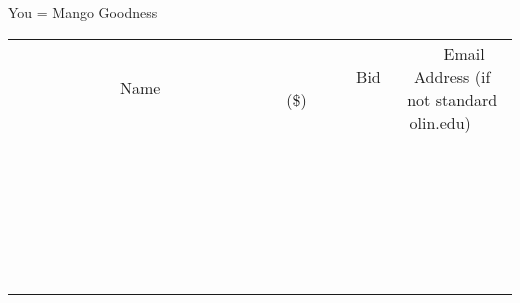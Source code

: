 \documentclass[11pt]{article}
\begin{document}
You = Mango Goodness
\\[6ex]
\begin{tabular}{c c c}
~~~~~~~~~~~~~Name~~~~~~~~~~~~~ & ~~~~~~~~~Bid (\$)~~~~~~~~~  & ~~~Email Address (if not standard olin.edu)~~~\\
 & & \\
\hline
 & & \\
\hline
 & & \\
\hline
 & & \\
\hline
 & & \\
\hline
 & & \\
\hline
 & & \\
\hline
 & & \\
\hline
 & & \\
\hline
 & & \\
\hline
 & & \\
\hline
 & & \\
\hline
 & & \\
\hline
 & & \\
\hline
 & & \\
\hline
 & & \\
\hline
 & & \\
\hline
 & & \\
\hline
 & & \\
\hline
 & & \\
\hline
 & & \\
\hline
 & & \\
\hline
 & & \\
\hline
 & & \\
\hline
 & & \\
\hline
 & & \\
\hline
\end{tabular}
\newpage
\end{document}
